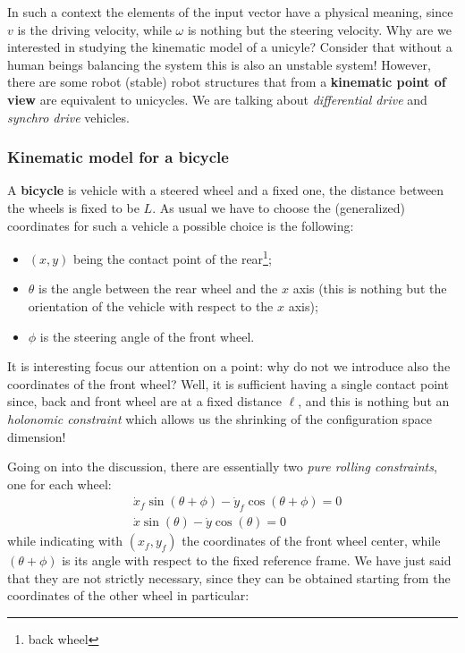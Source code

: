 In such a context the elements of the input vector have a physical meaning, since $v$ is the driving velocity, while $\omega$ is nothing but the steering velocity.  Why are we interested in studying the kinematic model of a unicyle? Consider that without a human beings balancing the system this is also an unstable system! However, there are some robot (stable) robot structures that from a \textbf{kinematic point of view} are equivalent to unicycles. We are talking about \emph{differential drive} and \emph{synchro drive} vehicles.

\subsubsection{Kinematic model for a bicycle}
A \textbf{bicycle} is vehicle with a steered wheel and a fixed one, the distance between the wheels is fixed to be $L$. As usual we have to choose the (generalized) coordinates for such a vehicle a possible choice is the following:
\begin{itemize}
    \itemsep-0.3em
    \item $(x,y)$ being the contact point of the rear\footnote{
        back wheel
    }; 
    \item $\theta$ is the angle between the rear wheel and the $x$ axis (this is nothing but the orientation of the vehicle with respect to the $x$ axis); 
    \item $\phi$ is the steering angle of the front wheel.
\end{itemize}
\begin{remark}
    It is interesting focus our attention on a point: why do not we introduce also the coordinates of the front wheel? Well, it is sufficient having a single contact point since, back and front wheel are at a fixed distance $\ell$, and this is nothing but an \textit{holonomic constraint} which allows us the shrinking of the configuration space dimension! 
\end{remark}
Going on into the discussion, there are essentially two \textit{pure rolling constraints}, one for each wheel: 
\begin{align}
    &\dot{x}_f \sin(\theta+\phi)-\dot{y}_f \cos(\theta+\phi)=0 \label{eq:front_pure_rolling}\\
    &\dot{x}\sin(\theta)-\dot{y}\cos(\theta)=0
\end{align}
while indicating with $(x_f,y_f)$ the coordinates of the front wheel center, while $(\theta+\phi)$ is its angle with respect to the fixed reference frame. We have just said that they are not strictly necessary, since they can be obtained starting from the coordinates of the other wheel in particular: 
